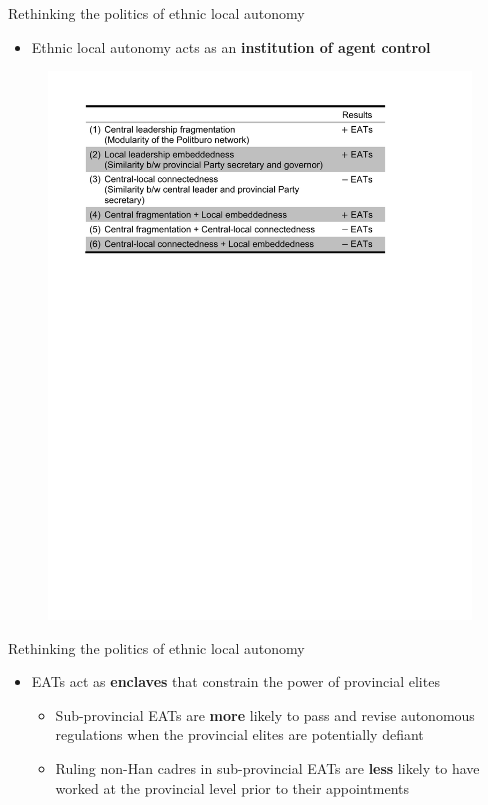 \documentclass[
  10pt,
  ignorenonframetext,
]{beamer}
\begin{document}
\begin{frame}{Rethinking the politics of ethnic local autonomy}
\label{rethinking-the-politics-of-ethnic-local-autonomy-3}
\begin{itemize}
  \item Ethnic local autonomy acts as an \textbf{institution of agent control}
\end{itemize}
\vspace{0.2cm}
\begin{figure}
  \center
  \includegraphics[scale=0.5]{Figs/findings}
\end{figure}
\end{frame}

\begin{frame}{Rethinking the politics of ethnic local autonomy}
\label{rethinking-the-politics-of-ethnic-local-autonomy-4}
\begin{itemize}
  \item EATs act as \textbf{enclaves} that constrain the power of provincial elites
  \vspace{0.3cm}
  \begin{itemize}
    \item Sub-provincial EATs are \textbf{more} likely to pass and revise autonomous regulations when the provincial elites are potentially defiant
    \vspace{0.2cm}
    \item Ruling non-Han cadres in sub-provincial EATs are \textbf{less} likely to have worked at the provincial level prior to their appointments
  \end{itemize}
\end{itemize}
\end{frame}
\end{document}
